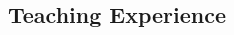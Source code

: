 \documentclass[10pt]{FreemanCV}
\begin{document}
\begin{paracol}{2}






	
	
	
	
	
	
	
	
	
	



\section{Teaching Experience}


\end{paracol}
\end{document}
